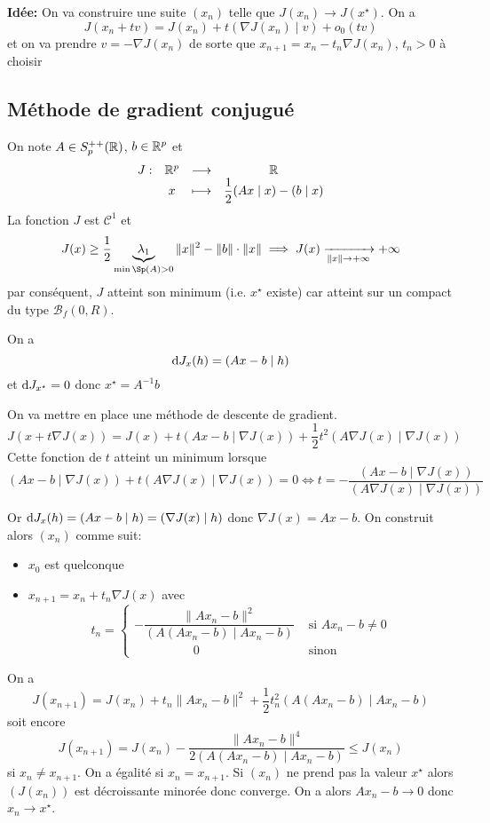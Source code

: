 \textbf{Idée:} On va construire une suite $(x_n)$ telle que $J(x_n)\to J(x^\star)$. On a \[
    J(x_n+tv)=J(x_n)+t(\nabla J(x_n)\;|\; v)+o_0(tv)
\]
et on va prendre $v=-\nabla J(x_n)$ de sorte que $x_{n+1}=x_n-t_n\nabla J(x_n)$, $t_n>0$ à choisir

\subsection{Méthode de gradient conjugué}


On note $A\in S_p^{++}(\mathbb R)$, $b\in\mathbb R^p$ et \[
    \begin{matrix}
        J: & \mathbb R^p & \longrightarrow & \mathbb R \\
           & x & \longmapsto & \dfrac12(Ax\;|\;x)-(b\;|\;x)
    \end{matrix}
\]
La fonction $J$ est $\mathcal C^1$ et \[
    J(x)\geq \frac 12 \underbrace{\lambda_1}_{\min \Sp(A)>0}\|x\|^2-\|b\|\cdot \|x\| \implies J(x)\xrightarrow[\|x\|\to +\infty]{}+\infty
\]
par conséquent, $J$ atteint son minimum (i.e. $x^\star$ existe) car atteint sur un compact du type $\mathcal B_f(0, R)$.

On a \[
    \mathrm{d} J_x(h)=(Ax-b\;|\;h)
\]
et $\mathrm{d} J_{x^\star}=0$ donc $x^\star=A^{-1}b$

On va mettre en place une méthode de descente de gradient. \[
    J(x+t\nabla J(x))=J(x)+ t (Ax-b\;|\;\nabla J(x))+\frac12t^2(A\nabla J(x)\;|\;\nabla J(x))
\]
Cette fonction de $t$ atteint un minimum lorsque \[
    (Ax-b\;|\;\nabla J(x))+t(A\nabla J(x)\;|\; \nabla J(x))=0 \iff t=-\frac{(Ax-b\;|\;\nabla J(x))}{(A\nabla J(x)\;|\; \nabla J(x))}
\]

Or $\mathrm{d} J_x(h)=(Ax-b\;|\;h)=(\nabla J(x)\;|\; h)$ donc $\nabla J(x)=Ax-b$. On construit alors $(x_n)$ comme suit: \begin{itemize}
    \item $x_0$ est quelconque
    \item $x_{n+1}=x_n+t_n\nabla J(x)$ avec \[
            t_n = \begin{cases}
                -\dfrac{\|Ax_n-b\|^2}{(A(Ax_n-b)\;|\;Ax_n-b)} &\text{ si } Ax_n-b\neq 0 \\[1em]
                \hspace{2cm}0 &\text{ sinon }
            \end{cases}
        \]
\end{itemize}

On a \[
    J(x_{n+1})=J(x_n) + t_n\|Ax_n-b\|^2 +\frac12t_n^2(A(Ax_n-b)\;|\;Ax_n-b)
\]
soit encore \[
    J(x_{n+1})=J(x_n) -\frac{\|Ax_n-b\|^4}{2(A(Ax_n-b)\;|\;Ax_n-b)} \leq J(x_n)
\]
si $x_n\neq x_{n+1}$. On a égalité si $x_n=x_{n+1}$.  
Si $(x_n)$ ne prend pas la valeur $x^\star$ alors $(J(x_n))$ est décroissante minorée donc converge. On a alors $Ax_n-b\longrightarrow 0$ donc $x_n\longrightarrow x^\star$.

